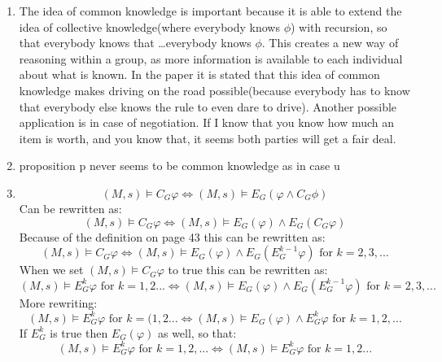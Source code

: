 \documentclass[12pt]{article} %
\begin{document}
\begin{enumerate}
    \item  The idea of common knowledge is important because it is able to
        extend the idea of collective knowledge(where everybody knows $\phi$) with recursion, so that
        everybody knows that \dots  everybody knows $\phi$.
        This creates a new way of reasoning within a group, as more information
        is available to each individual about what is known.
        In the paper it is stated that this idea of common knowledge makes
        driving on the road possible(because everybody has to know that
        everybody else knows the rule to even dare to drive).
        Another possible application is in case of negotiation. If I know that
        you know how much an item  is worth, and you know that, it seems both parties
        will get a fair deal. 
    \item proposition p never seems to be common knowledge as in case u
        
    \item 
        \begin{equation}
        (M,s) \models C_G\varphi \Leftrightarrow (M,s) \models E_G(\varphi \wedge
        C_G\phi) 
        \end{equation}
        Can be rewritten as:
        \begin{equation}
            (M,s) \models C_G\varphi \Leftrightarrow (M,s) \models E_G(\varphi) \wedge
            E_G (C_G\varphi) 
        \end{equation}
        Because of the definition on page 43 this can be rewritten as:
        \begin{equation}
            (M,s) \models C_G\varphi \Leftrightarrow (M,s) \models E_G(\varphi) \wedge
            E_G(E_G^{k-1}\varphi) \mbox{ for } k = 2,3, ... 
        \end{equation}
        When we set $(M,s)\models C_G\varphi$ to true this can be rewritten as:
        \begin{equation}
            (M,s) \models E_G^k\varphi  \mbox{ for } k = 1,2 ... \Leftrightarrow (M,s) \models E_G(\varphi) \wedge
            E_G(E_G^{k-1}\varphi) \mbox{ for } k = 2, 3, ... 
        \end{equation}
        More rewriting:
        \begin{equation}
            (M,s) \models E_G^k\varphi  \mbox{ for } k = (1,2 ... \Leftrightarrow (M,s) \models E_G(\varphi) \wedge
            E_G^{k}\varphi 	\mbox{ for } k = 1, 2, ...  
        \end{equation}
        If $E_G^k$ is true then $E_G(\varphi)$ as well, so that:
        \begin{equation}
            (M,s) \models E_G^k\varphi  \mbox{ for } k = 1, 2, ... \Leftrightarrow (M,s)
            \models
            E_G^{k}\varphi \mbox{ for } k = 1, 2...  
        \end{equation}


\end{enumerate}
\end{document}
